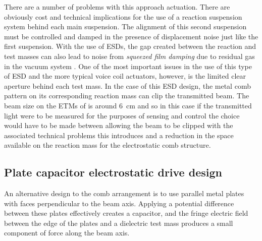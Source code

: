There are a number of problems with this approach actuation. There are obviously cost and technical implications for the use of a reaction suspension system behind each main suspension. The alignment of this second suspension must be controlled and damped in the presence of displacement noise just like the first suspension. With the use of \glspl{ESD}, the gap created between the reaction and test masses can also lead to noise from \emph{squeezed film damping} due to residual gas in the vacuum system \cite{Dolesi2011}. One of the most important issues in the use of this type of \gls{ESD} and the more typical voice coil actuators, however, is the limited clear aperture behind each test mass. In the case of this \gls{ESD} design, the metal comb pattern on its corresponding reaction mass can clip the transmitted beam. The beam size on the \glspl{ETM} of \ALIGO{} is around \SI{6}{\centi\meter} and so in this case if the transmitted light were to be measured for the purposes of sensing and control the choice would have to be made between allowing the beam to be clipped with the associated technical problems this introduces and a reduction in the space available on the reaction mass for the electrostatic comb structure.

\subsection{Plate capacitor electrostatic drive design}
An alternative design to the comb arrangement is to use parallel metal plates with faces perpendicular to the beam axis. Applying a potential difference between these plates effectively creates a capacitor, and the fringe electric field between the edge of the plates and a dielectric test mass produces a small component of force along the beam axis.

